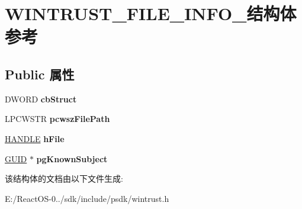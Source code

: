 \hypertarget{struct_w_i_n_t_r_u_s_t___f_i_l_e___i_n_f_o__}{}\section{W\+I\+N\+T\+R\+U\+S\+T\+\_\+\+F\+I\+L\+E\+\_\+\+I\+N\+F\+O\+\_\+结构体 参考}
\label{struct_w_i_n_t_r_u_s_t___f_i_l_e___i_n_f_o__}
\subsection*{Public 属性}
\begin{DoxyCompactItemize}
\item 
\mbox{\label{struct_w_i_n_t_r_u_s_t___f_i_l_e___i_n_f_o___a267b448797a98bf5698ac934e04c00ea}} 
D\+W\+O\+RD {\bfseries cb\+Struct}
\item 
\mbox{\label{struct_w_i_n_t_r_u_s_t___f_i_l_e___i_n_f_o___a6ed2480d908d2f1e4dc160cc18ca3cb3}} 
L\+P\+C\+W\+S\+TR {\bfseries pcwsz\+File\+Path}
\item 
\mbox{\label{struct_w_i_n_t_r_u_s_t___f_i_l_e___i_n_f_o___a433816b8ed208bed8c7cfc3e43d97873}} 
\hyperlink{interfacevoid}{H\+A\+N\+D\+LE} {\bfseries h\+File}
\item 
\mbox{\label{struct_w_i_n_t_r_u_s_t___f_i_l_e___i_n_f_o___a42d29503be7743e91a49a2c8815110b9}} 
\hyperlink{interface_g_u_i_d}{G\+U\+ID} $\ast$ {\bfseries pg\+Known\+Subject}
\end{DoxyCompactItemize}


该结构体的文档由以下文件生成\+:\begin{DoxyCompactItemize}
\item 
E\+:/\+React\+O\+S-\/0../sdk/include/psdk/wintrust.\+h\end{DoxyCompactItemize}
